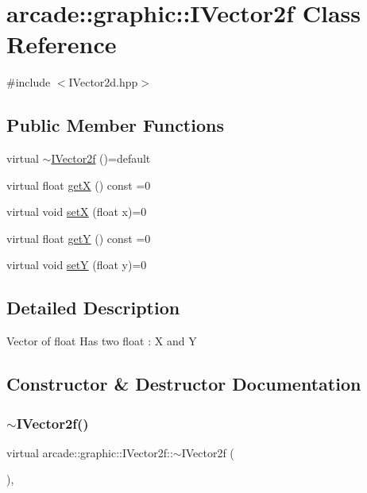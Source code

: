 \hypertarget{classarcade_1_1graphic_1_1_i_vector2f}{}\section{arcade\+::graphic\+::I\+Vector2f Class Reference}
\label{classarcade_1_1graphic_1_1_i_vector2f}


{\ttfamily \#include $<$I\+Vector2d.\+hpp$>$}

\subsection*{Public Member Functions}
\begin{DoxyCompactItemize}
\item 
virtual \mbox{\hyperlink{classarcade_1_1graphic_1_1_i_vector2f_a3d7a2d030d2b13846fea3baf9a8c9280}{$\sim$\+I\+Vector2f}} ()=default
\item 
virtual float \mbox{\hyperlink{classarcade_1_1graphic_1_1_i_vector2f_a04ebd90784d6aa580970d50643a7cd4c}{getX}} () const =0
\item 
virtual void \mbox{\hyperlink{classarcade_1_1graphic_1_1_i_vector2f_a9c77ec51c33c9b20fe9494029fea18a2}{setX}} (float x)=0
\item 
virtual float \mbox{\hyperlink{classarcade_1_1graphic_1_1_i_vector2f_aaf18cfa7dca65b1b435d88198f68c39e}{getY}} () const =0
\item 
virtual void \mbox{\hyperlink{classarcade_1_1graphic_1_1_i_vector2f_ad10b9e1e6d0481c15678bb5ec61916bf}{setY}} (float y)=0
\end{DoxyCompactItemize}


\subsection{Detailed Description}
Vector of float Has two float \+: X and Y 

\subsection{Constructor \& Destructor Documentation}
\mbox{\label{classarcade_1_1graphic_1_1_i_vector2f_a3d7a2d030d2b13846fea3baf9a8c9280}} 
\subsubsection{\texorpdfstring{$\sim$IVector2f()}{~IVector2f()}}
{\footnotesize\ttfamily virtual arcade\+::graphic\+::\+I\+Vector2f\+::$\sim$\+I\+Vector2f (\begin{DoxyParamCaption}{ }\end{DoxyParamCaption})\hspace{0.3cm}{\ttfamily [virtual]}, {\ttfamily [default]}}

